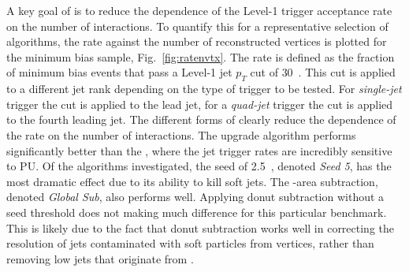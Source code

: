 A key goal of \PUS is to reduce the dependence of the Level-1 trigger
acceptance rate on the number of \PU interactions. To quantify this
for a representative selection of algorithms, the rate against the
number of reconstructed vertices is plotted for the minimum bias sample,
Fig.~\ref{fig:ratenvtx}. The rate is defined as the fraction of
minimum bias events that pass a Level-1 jet $p_T$ cut of $30$~\gev.
This cut is applied to a different jet rank depending on the type of
trigger to be tested. For \emph{single-jet} trigger the cut is applied to
the lead jet, for a \emph{quad-jet} trigger the cut is applied to the
fourth leading jet. The different forms of \PUS clearly reduce the
dependence of the rate on the number of interactions. The upgrade algorithm
performs significantly better than the \GCT, where the jet trigger
rates are incredibly sensitive to PU. Of the algorithms investigated,
the seed of 2.5~\gev, denoted \emph{Seed 5}, has the most dramatic
effect due to its ability to kill soft \PU jets. The \rho-area
subtraction, denoted \emph{Global Sub}, also performs well. Applying
donut subtraction without a seed threshold does not making much difference for this
particular \PUS benchmark. This is likely due to the fact that
donut subtraction works well in correcting the resolution of jets
contaminated with soft particles from \PU vertices, rather than
removing low \pT jets that originate from \PU.

